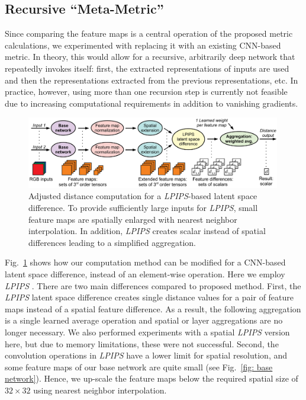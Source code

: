 \subsection{Recursive ``Meta-Metric''} \label{append: meta metric}
Since comparing the feature maps is a central operation of the proposed metric calculations, we experimented with replacing it with an existing CNN-based metric. In theory, this would allow for a recursive, arbitrarily deep network that repeatedly invokes itself: first, the extracted representations of inputs are used and then the representations extracted from the previous representations, etc. In practice, however, using more than one recursion step is currently not feasible due to increasing computational requirements in addition to vanishing gradients.

\begin{figure}[bp]
    \centering
    \includegraphics[width=0.99\textwidth]{Images/DistanceLatentSpaceLPIPS}
    \caption{Adjusted distance computation for a \textit{LPIPS}-based latent space difference. To provide sufficiently large inputs for \textit{LPIPS}, small feature maps are spatially enlarged with nearest neighbor interpolation. In addition, \textit{LPIPS} creates scalar instead of spatial differences leading to a simplified aggregation.}
    \label{fig: distance latent lpips}
\end{figure}

Fig.~\ref{fig: distance latent lpips} shows how our computation method can be modified for a CNN-based latent space difference, instead of an element-wise operation. Here we employ \textit{LPIPS} \citep{zhang2018}. There are two main differences compared to proposed method. First, the \textit{LPIPS} latent space difference creates single distance values for a pair of feature maps instead of a spatial feature difference. As a result, the following aggregation is a single learned average operation and spatial or layer aggregations are no longer necessary. We also performed experiments with a spatial \textit{LPIPS} version here, but due to memory limitations, these were not successful. Second, the convolution operations in \textit{LPIPS}
have a lower limit for spatial resolution, and some feature maps of our base network are quite small (see Fig.~\ref{fig: base network}). Hence, we up-scale the feature maps below the required spatial size of $32\times32$ using nearest neighbor interpolation.

